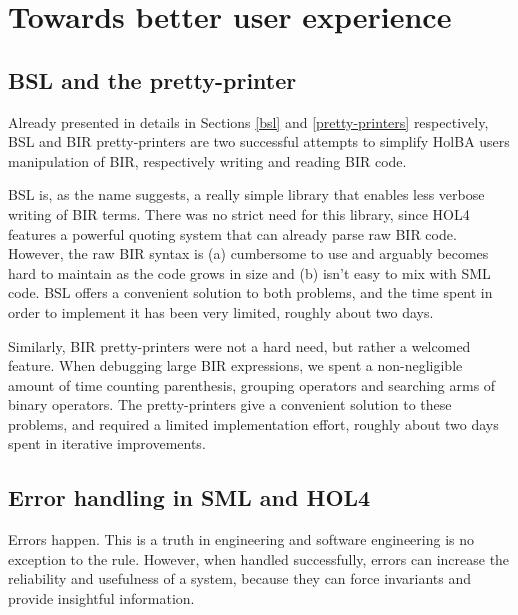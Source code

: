 \documentclass{kththesis}
\begin{document}
{\section{Towards better user experience} \label{towards-user-exp}
\subsection{BSL and the pretty-printer}

Already presented in details in Sections \ref{bsl} and \ref{pretty-printers} respectively, BSL and BIR pretty-printers are two successful attempts to simplify HolBA users manipulation of BIR, respectively writing and reading BIR code.

BSL is, as the name suggests, a really simple library that enables less verbose writing of BIR terms. There was no strict need for this library, since HOL4 features a powerful quoting system that can already parse raw BIR code. However, the raw BIR syntax is (a) cumbersome to use and arguably becomes hard to maintain as the code grows in size and (b) isn't easy to mix with SML code. BSL offers a convenient solution to both problems, and the time spent in order to implement it has been very limited, roughly about two days.

Similarly, BIR pretty-printers were not a hard need, but rather a welcomed feature. When debugging large BIR expressions, we spent a non-negligible amount of time counting parenthesis, grouping operators and searching arms of binary operators. The pretty-printers give a convenient solution to these problems, and required a limited implementation effort, roughly about two days spent in iterative improvements.

\subsection{Error handling in SML and HOL4}

Errors happen. This is a truth in engineering and software engineering is no exception to the rule. However, when handled successfully, errors can increase the reliability and usefulness of a system, because they can force invariants and provide insightful information.

}
\end{document}
